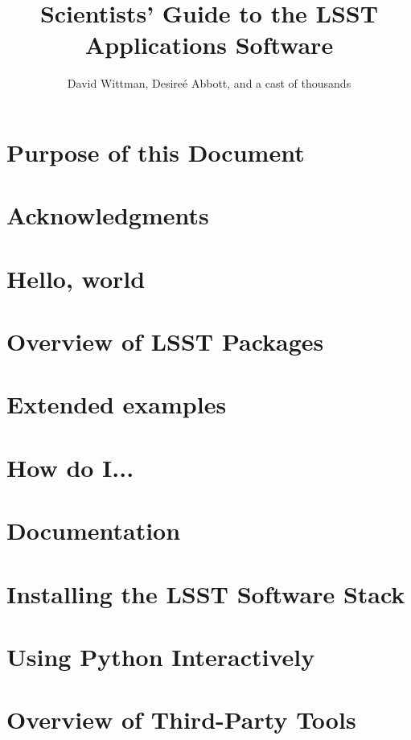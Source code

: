 \documentclass[oneside]{book}
\title{Scientists' Guide to the LSST Applications Software}
\author{David Wittman, Desire\'{e} Abbott, and a cast of thousands}
\begin{document}
\maketitle

\chapter*{Purpose of this Document\label{chap-purpose}}


\chapter*{Acknowledgments\label{chap-acknowledgements}}



\chapter{Hello, world\label{chap-hello}}


\chapter{Overview of LSST Packages\label{chap-overview}}



\chapter{Extended examples\label{chap-examples}}


\chapter{How do I...\label{chap-howto}}


\chapter{Documentation\label{chap-doc}}


%
% 



\appendix

\chapter{Installing the LSST Software Stack\label{appendix-stackinstall}}


\chapter{Using Python Interactively\label{appendix-interactivePython}}


\chapter{Overview of Third-Party Tools\label{appendix-thirdparty}}

\end{document}
